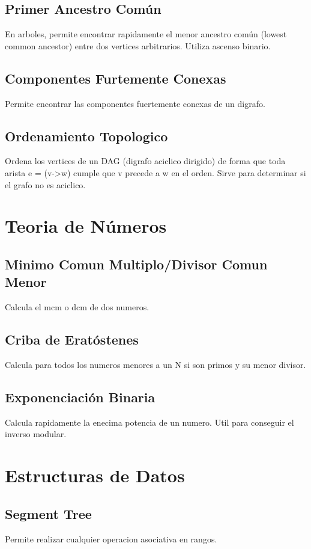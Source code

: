 \documentclass[11pt,a4paper,oneside]{book}
\newenvironment{programa}[2]{%
  \section{#1}%
  \noindent #2\par\medskip
}{%
  \medskip
}
\begin{document}
\begin{programa}{Primer Ancestro Común}{En arboles, permite encontrar rapidamente el menor ancestro común (lowest common ancestor) entre dos vertices arbitrarios. Utiliza ascenso binario.}
    
\end{programa}

\begin{programa}{Componentes Furtemente Conexas}{Permite encontrar las componentes fuertemente conexas de un digrafo.}
    
\end{programa}

\begin{programa}{Ordenamiento Topologico}{Ordena los vertices de un DAG (digrafo aciclico dirigido) de forma que toda arista e = (v->w) cumple que v precede a w en el orden. Sirve para determinar si el grafo no es aciclico.}
    
\end{programa}

\chapter{Teoria de Números}

\begin{programa}{Minimo Comun Multiplo/Divisor Comun Menor}{Calcula el mcm o dcm de dos numeros.}
    
\end{programa}

\begin{programa}{Criba de Eratóstenes}{Calcula para todos los numeros menores a un N si son primos y su menor divisor.}
    
\end{programa}

\begin{programa}{Exponenciación Binaria}{Calcula rapidamente la enecima potencia de un numero. Util para conseguir el inverso modular.}
    
\end{programa}

\chapter{Estructuras de Datos}

\begin{programa}{Segment Tree}{Permite realizar cualquier operacion asociativa en rangos.}
    
\end{programa}
\end{document}
